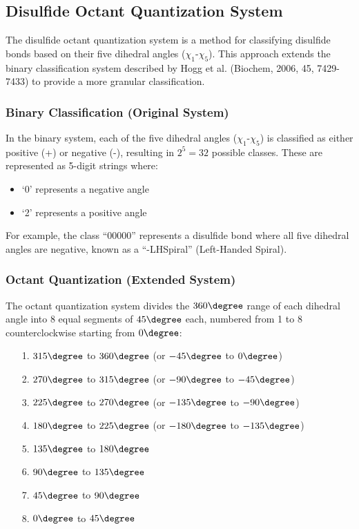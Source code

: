 \subsection{Disulfide Octant Quantization System}

The disulfide octant quantization system is a method for classifying disulfide bonds based on their five dihedral angles ($\chi_1$-$\chi_5$). This approach extends the binary classification system described by Hogg et al. (Biochem, 2006, 45, 7429-7433) to provide a more granular classification.

\subsubsection{Binary Classification (Original System)}
In the binary system, each of the five dihedral angles ($\chi_1$-$\chi_5$) is classified as either positive (+) or negative (-), resulting in $2^5 = 32$ possible classes. These are represented as 5-digit strings where:
\begin{itemize}
    \item `0' represents a negative angle
    \item `2' represents a positive angle
\end{itemize}

For example, the class ``00000'' represents a disulfide bond where all five dihedral angles are negative, known as a ``-LHSpiral'' (Left-Handed Spiral).

\subsubsection{Octant Quantization (Extended System)}
The octant quantization system divides the $360\degree$ range of each dihedral angle into 8 equal segments of $45\degree$ each, numbered from 1 to 8 counterclockwise starting from $0\degree$:
\begin{itemize}
    \item[1.] $315\degree$ to $360\degree$ (or $-45\degree$ to $0\degree$)
    \item[2.] $270\degree$ to $315\degree$ (or $-90\degree$ to $-45\degree$)
    \item[3.] $225\degree$ to $270\degree$ (or $-135\degree$ to $-90\degree$)
    \item[4.] $180\degree$ to $225\degree$ (or $-180\degree$ to $-135\degree$)
    \item[5.] $135\degree$ to $180\degree$
    \item[6.] $90\degree$ to $135\degree$
    \item[7.] $45\degree$ to $90\degree$
    \item[8.] $0\degree$ to $45\degree$
\end{itemize}

